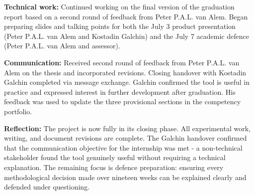 \documentclass[11pt,a4paper]{article}
\begin{document}
\textbf{Technical work:} Continued working on the final version of the graduation report based on a second round of feedback from Peter P.A.L. van Alem. Began preparing slides and talking points for both the July 3 product presentation (Peter P.A.L. van Alem and Kostadin Galchin) and the July 7 academic defence (Peter P.A.L. van Alem and assessor).

\textbf{Communication:} Received second round of feedback from Peter P.A.L. van Alem on the thesis and incorporated revisions. Closing handover with Kostadin Galchin completed via message exchange. Galchin confirmed the tool is useful in practice and expressed interest in further development after graduation. His feedback was used to update the three provisional sections in the competency portfolio.

\textbf{Reflection:} The project is now fully in its closing phase. All experimental work, writing, and document revisions are complete. The Galchin handover confirmed that the communication objective for the internship was met  -  a non-technical stakeholder found the tool genuinely useful without requiring a technical explanation. The remaining focus is defence preparation: ensuring every methodological decision made over nineteen weeks can be explained clearly and defended under questioning.
\end{document}
